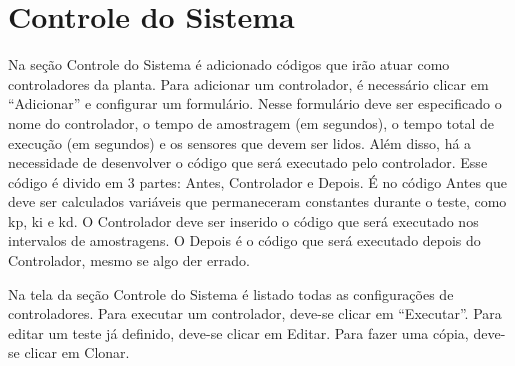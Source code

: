 
\chapter{Controle do Sistema}%
\label{chapter:controle-do-sistema}

Na seção Controle do Sistema é adicionado códigos que irão atuar como controladores da planta. Para adicionar um controlador, é necessário clicar em “Adicionar” e configurar um formulário. Nesse formulário deve ser especificado o nome do controlador, o tempo de amostragem (em segundos), o tempo total de execução (em segundos) e os sensores que devem ser lidos. Além disso, há a necessidade de desenvolver o código que será executado pelo controlador. Esse código é divido em 3 partes: Antes, Controlador e Depois. É no código Antes que deve ser calculados variáveis que permaneceram constantes durante o teste, como kp, ki e kd. O Controlador deve ser inserido o código que será executado nos intervalos de amostragens. O Depois é o código que será executado depois do Controlador, mesmo se algo der errado.

Na tela da seção Controle do Sistema é listado todas as configurações de controladores. Para executar um controlador, deve-se clicar em “Executar”. Para editar um teste já definido, deve-se clicar em Editar. Para fazer uma cópia, deve-se clicar em Clonar. 
